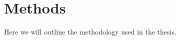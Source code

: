 \documentclass{subfiles}
\begin{document}
\chapter{Methods}
Here we will outline the methodology used in the thesis. 
\end{document}
